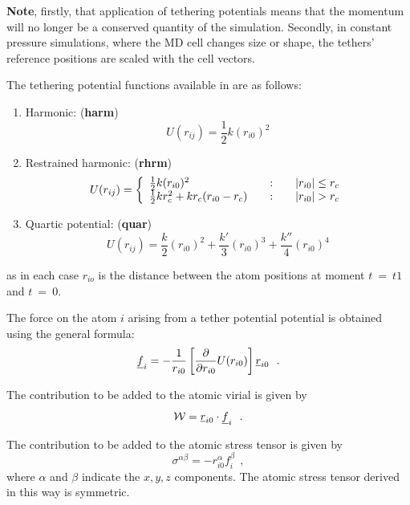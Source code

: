 {\bf Note}, firstly, that application of tethering potentials means that
the momentum will no longer be a conserved quantity of the
simulation.  Secondly, in constant pressure simulations, where the
MD cell changes size or shape, the tethers' reference positions
are scaled with the cell vectors.

The tethering potential functions available in \D are as follows:
\begin{enumerate}
\item Harmonic:  ({\bf harm})
\begin{equation}
U(r_{ij}) = \frac{1}{2}k(r_{i0})^{2}
\end{equation}
\item Restrained harmonic:  ({\bf rhrm})
\begin{equation}
U(r_{ij}) = \left\{ \begin{array} {l@{\qquad:\qquad}l}
\frac{1}{2}k(r_{i0})^{2} & |r_{i0}| \le r_{c} \\
\frac{1}{2}kr_{c}^{2} + kr_{c}(r_{i0}-r_{c}) & |r_{i0}| > r_{c}
\end{array} \right.
\end{equation}
\item Quartic potential:  ({\bf quar})
\begin{equation}
U(r_{ij}) =
\frac{k}{2}(r_{i0})^{2}+\frac{k'}{3}(r_{i0})^{3}+\frac{k''}{4}(r_{i0})^{4}
\end{equation}
\end{enumerate}
as in each case $r_{io}$ is the distance between the atom
positions at moment $t~=~t1$ and $t~=~0$.

The force on the atom $i$ arising from a tether potential
potential is obtained using the general
formula:
\begin{equation}
\mbox{$\underline{f}$}_{i} = -\frac{1}{{r}_{i0}}\left[ \frac{\partial }{\partial
r_{i0}}U(r_{i0})\right]\mbox{$\underline{r}$}_{i0}~~.
\end{equation}

The contribution to be added to the atomic virial is given by
\begin{equation}
{\cal W} = \mbox{$\underline{r}$}_{i0} \cdot \mbox{$\underline{f}$}_{i}~~.
\end{equation}

The contribution to be added to the atomic stress tensor is given
by
\begin{equation}
\sigma^{\alpha \beta} = -r_{i0}^{\alpha} f_{i}^{\beta}~~,
\end{equation}
where $\alpha$ and $\beta$ indicate the $x,y,z$ components.  The
atomic stress tensor derived in this way is
symmetric.

